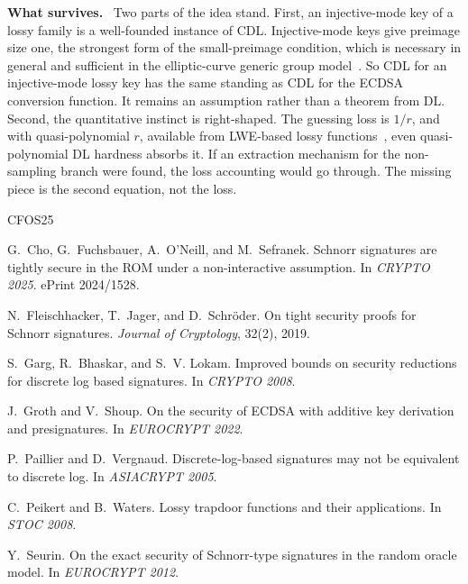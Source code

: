 \documentclass[11pt]{article}
\newcommand{\heading}[1]{\medskip\noindent\textbf{#1}\ }
\begin{document}
\heading{What survives.}
Two parts of the idea stand. First, an injective-mode key of a lossy family is a well-founded instance of CDL. Injective-mode keys give preimage size one, the strongest form of the small-preimage condition, which is necessary in general and sufficient in the elliptic-curve generic group model~\cite{CFOS25}. So CDL for an injective-mode lossy key has the same standing as CDL for the ECDSA conversion function. It remains an assumption rather than a theorem from DL. Second, the quantitative instinct is right-shaped. The guessing loss is $1/r$, and with quasi-polynomial $r$, available from LWE-based lossy functions~\cite{PW08}, even quasi-polynomial DL hardness absorbs it. If an extraction mechanism for the non-sampling branch were found, the loss accounting would go through. The missing piece is the second equation, not the loss.

\begin{thebibliography}{CFOS25}

G.~Cho, G.~Fuchsbauer, A.~O'Neill, and M.~Sefranek.
Schnorr signatures are tightly secure in the {ROM} under a non-interactive assumption.
In \emph{CRYPTO 2025}. ePrint 2024/1528.

N.~Fleischhacker, T.~Jager, and D.~Schr\"oder.
On tight security proofs for {Schnorr} signatures.
\emph{Journal of Cryptology}, 32(2), 2019.

S.~Garg, R.~Bhaskar, and S.~V. Lokam.
Improved bounds on security reductions for discrete log based signatures.
In \emph{CRYPTO 2008}.

J.~Groth and V.~Shoup.
On the security of {ECDSA} with additive key derivation and presignatures.
In \emph{EUROCRYPT 2022}.

P.~Paillier and D.~Vergnaud.
Discrete-log-based signatures may not be equivalent to discrete log.
In \emph{ASIACRYPT 2005}.

C.~Peikert and B.~Waters.
Lossy trapdoor functions and their applications.
In \emph{STOC 2008}.

Y.~Seurin.
On the exact security of {Schnorr}-type signatures in the random oracle model.
In \emph{EUROCRYPT 2012}.

\end{thebibliography}
\end{document}
